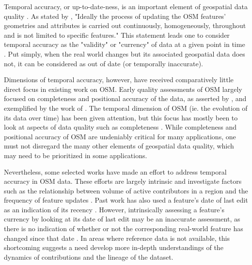 Temporal accuracy, or up-to-date-ness, is an important element of geospatial data quality \parencite{van_oort_spatial_2006}. As stated by \textcite[p. 884]{barron_comprehensive_2014}, "Ideally the process of updating the OSM features’ geometries and attributes is carried out continuously, homogeneously, throughout and is not limited to speciﬁc features." This statement leads one to consider temporal accuracy as the "validity" or "currency" of data at a given point in time \parencite[p. 17]{van_oort_spatial_2006}. Put simply, when the real world changes but its associated geospatial data does not, it can be considered as out of date (or temporally inaccurate).	

Dimensions of temporal accuracy, however, have received comparatively little direct focus in existing work on OSM. Early quality assessments of OSM largely focused on completeness and positional accuracy of the data, as asserted by \textcite[p.83]{neis_recent_2014}, and exemplified by the work of \textcite{haklay_how_2010-1, haklay_how_2010, helbich_comparative_2012}. The temporal dimension of OSM (ie. the evolution of its data over time) has been given attention, but this focus has mostly been to look at aspects of data quality such as completeness \parencite{grochenig_estimating_2014}. While completeness and positional accuracy of OSM are undeniably critical for many applications, one must not disregard the many other elements of geospatial data quality, which may need to be prioritized in some applications. 

Nevertheless, some selected works have made an effort to address temporal accuracy in OSM data. These efforts are largely intrinsic and investigate factors such as the relationship between volume of active contributors in a region and the frequency of feature updates \parencite{girres_quality_2010}. Past work has also used a feature's date of last edit as an indication of its recency \parencite{minghini_open_2018, roick_technical_2012}. However, intrinsically assessing a feature’s currency by looking at its date of last edit may be an inaccurate assessment, as there is no indication of whether or not the corresponding real-world feature has changed since that date \parencite{barron_comprehensive_2014}. In areas where reference data is not available, this shortcoming suggests a need develop more in-depth understandings of the dynamics of contributions and the lineage of the dataset. 

